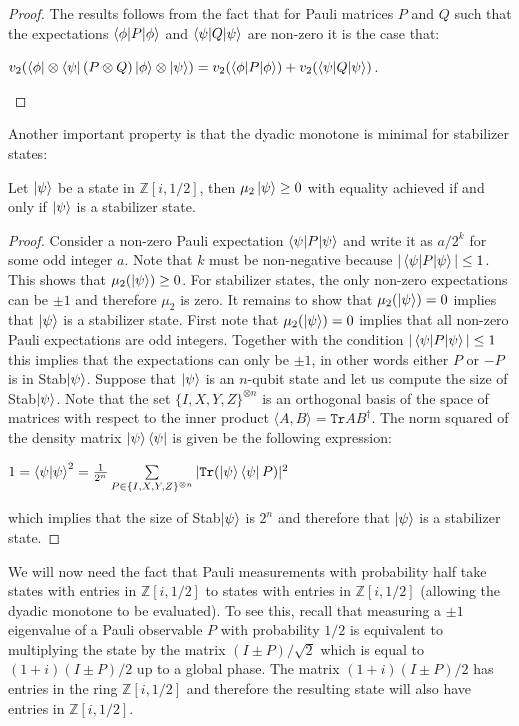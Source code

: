\documentclass[12pt]{dalthesis}
\begin{document}
\begin{proof}
The results follows from the fact that for Pauli matrices $P$ and $Q$ such that the expectations $\braket{\phi | P |\phi}$ and $\braket{\psi | Q | \psi}$ are non-zero it is the case that:
\begin{center}
$v_2 (\bra{\phi} \otimes \bra{\psi} (P \otimes Q) \ket{\phi} \otimes \ket{\psi}) = v_2 (\braket{\phi | P | \phi}) + v_2(\braket{\psi | Q | \psi})$.
\end{center}
\end{proof}

Another important property is that the dyadic monotone is minimal for stabilizer states:
\begin{proposition}
Let $\ket{\psi}$ be a state in $\mathbb{Z}[i, 1/2]$, then $\mu_2 \ket{\psi} \geq 0$ with equality achieved if and only if $\ket{\psi}$ is a stabilizer state.
\end{proposition}
\begin{proof}
Consider a non-zero Pauli expectation $\braket{\psi |P| \psi}$ and write it as $a/2^k$ for some odd integer $a$. Note that $k$ must be non-negative because $|\braket{\psi |P| \psi}| \leq 1$. This shows that $\mu_2 (\ket{\psi}) \geq 0$. For stabilizer states, the only non-zero expectations can be $\pm 1$ and therefore $\mu_2$ is zero. It remains to show that $\mu_2 (\ket{\psi}) = 0$ implies that $\ket{\psi}$ is a stabilizer state. First note that $\mu_2 (\ket{\psi}) = 0$ implies that all non-zero Pauli expectations are odd integers. Together with the condition $|\braket{\psi |P| \psi}| \leq 1$ this implies that the expectations can only be $\pm 1$, in other words either $P$ or $-P$ is in Stab$\ket{\psi}$. Suppose that $\ket{\psi}$ is an $n$-qubit state and let us compute the size of Stab$\ket{\psi}$. Note that the set $\{ I, X, Y, Z \}^{\otimes n}$ is an orthogonal basis of the space of matrices with respect to the inner product $\langle A, B \rangle = \texttt{Tr} AB^{\dag}$. The norm squared of the density matrix $\ket{\psi} \bra{\psi}$ is given be the following expression:
\begin{center}
$1 = \braket{\psi | \psi}^2 = \frac{1}{2^n} \sum\limits_{P \in \{ I, X, Y, Z \}^{\otimes n}} |\texttt{Tr}(\ket{\psi}\bra{\psi}P)|^2$
\end{center}
which implies that the size of Stab$\ket{\psi}$ is $2^n$ and therefore that $\ket{\psi}$ is a stabilizer state.
\end{proof}

We will now need the fact that Pauli measurements with probability half take states with entries in $\mathbb{Z}[i, 1/2]$ to states with entries in $\mathbb{Z}[i, 1/2]$ (allowing the dyadic monotone to be evaluated). To see this, recall that measuring a $\pm 1$ eigenvalue of a Pauli observable $P$ with probability $1/2$ is equivalent to multiplying the state by the matrix $(I \pm P)/\sqrt{2}$ which is equal to $(1 + i)(I \pm P)/2$ up to a global phase. The matrix $(1 + i)(I \pm P)/2$ has entries in the ring $\mathbb{Z}[i, 1/2]$ and therefore the resulting state will also have entries in $\mathbb{Z}[i, 1/2]$.
\end{document}

